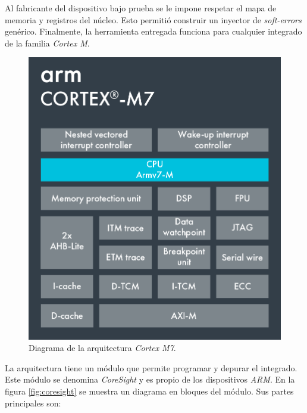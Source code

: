 Al fabricante del dispositivo bajo prueba se le impone respetar el mapa de memoria y registros del núcleo.
Esto permitió construir un inyector de \emph{soft-errors} genérico.
Finalmente, la herramienta entregada funciona para cualquier integrado de la familia \emph{Cortex M}.

\begin{figure}[htbp]
	\centering
	\includegraphics[width=.7\textwidth]{./Figures/Cortex-M7.png}
    \caption{Diagrama de la arquitectura \emph{Cortex M7}\protect\footnotemark.}
	\label{fig:cortexm}
\end{figure}


La arquitectura tiene un módulo que permite programar y depurar el integrado.
Este módulo se denomina \emph{CoreSight} y es propio de los dispositivos \emph{ARM}.
En la figura \ref{fig:coresight} se muestra un diagrama en bloques del módulo.
Sus partes principales son:

